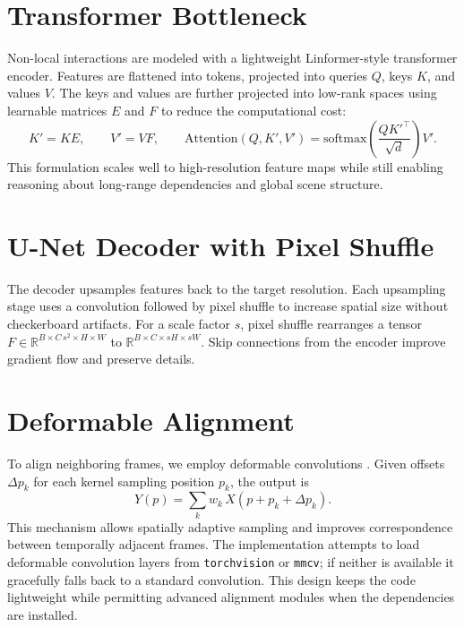 \documentclass{article}
\begin{document}
\section{Transformer Bottleneck}
Non-local interactions are modeled with a lightweight Linformer-style transformer encoder. Features are flattened into tokens, projected into queries $Q$, keys $K$, and values $V$. The keys and values are further projected into low-rank spaces using learnable matrices $E$ and $F$ to reduce the computational cost:
\begin{equation}
K' = KE, \qquad V' = VF, \qquad \mathrm{Attention}(Q,K',V') = \mathrm{softmax}\left(\frac{Q {K'}^{\top}}{\sqrt{d}}\right)V'.
\end{equation}
This formulation scales well to high-resolution feature maps while still enabling reasoning about long-range dependencies and global scene structure.

\section{U-Net Decoder with Pixel Shuffle}
The decoder upsamples features back to the target resolution. Each upsampling stage uses a convolution followed by pixel shuffle to increase spatial size without checkerboard artifacts. For a scale factor $s$, pixel shuffle rearranges a tensor $F \in \mathbb{R}^{B\times C\,s^2\times H\times W}$ to $\mathbb{R}^{B\times C\times sH\times sW}$. Skip connections from the encoder improve gradient flow and preserve details.

\section{Deformable Alignment}
To align neighboring frames, we employ deformable convolutions \cite{Dai2017dc}. Given offsets $\Delta p_k$ for each kernel sampling position $p_k$, the output is
\begin{equation}
Y(p) = \sum_{k} w_k\, X(p + p_k + \Delta p_k).
\end{equation}
This mechanism allows spatially adaptive sampling and improves correspondence between temporally adjacent frames. The implementation attempts to load deformable convolution layers from \texttt{torchvision} or \texttt{mmcv}; if neither is available it gracefully falls back to a standard convolution. This design keeps the code lightweight while permitting advanced alignment modules when the dependencies are installed.
\end{document}
